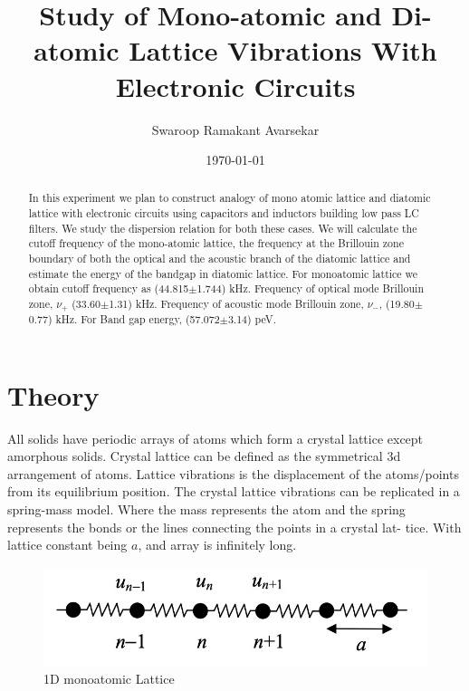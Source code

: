 \documentclass[a4paper, amsfonts, amssymb, amsmath, reprint, showkeys, nofootinbib, twoside]{revtex4-1}
\begin{document}
\title{Study of Mono-atomic and Di-atomic Lattice Vibrations With Electronic Circuits}
\author{Swaroop Ramakant Avarsekar}
\date{\today}
	
\begin{abstract}
	In this experiment we plan to construct analogy of mono atomic lattice and diatomic lattice with electronic circuits using capacitors and inductors building low pass LC filters. We study the dispersion relation for both these cases. We will calculate the cutoff frequency of the mono-atomic lattice, the frequency at the Brillouin zone boundary of both the optical and the acoustic branch of the diatomic lattice and estimate the energy of the bandgap in diatomic lattice. For monoatomic lattice we obtain cutoff frequency as (44.815$\pm$1.744) kHz. Frequency of optical mode Brillouin zone, $\nu_+$ (33.60$\pm$1.31) kHz. Frequency of acoustic mode Brillouin zone, $\nu_-$, (19.80$\pm$0.77) kHz. For Band gap energy, (57.072$\pm$3.14) peV. 
\end{abstract}
	
	
\maketitle

\section{Theory}
All solids have periodic arrays of atoms which form a crystal lattice except amorphous solids. Crystal lattice can be defined as the symmetrical 3d arrangement of atoms. Lattice vibrations is the displacement of the atoms/points from its equilibrium position. The crystal lattice vibrations can be replicated in a spring-mass model. Where the mass represents the atom and the spring represents the bonds or the lines connecting the points in a crystal lat- tice. With lattice constant being $a$, and array is infinitely long.

\begin{figure}[H]
	\centering
	\includegraphics[scale=0.25]{1} 
	\caption{1D monoatomic Lattice}
	\label{s}
\end{figure}
\end{document}
